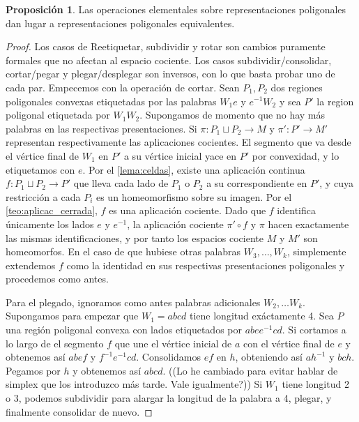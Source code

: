 \documentclass[10pt]{report}
\theoremstyle{definition}
\newtheorem{prop}[defin]{Proposición}
\begin{document}
\begin{prop}%
Las operaciones elementales sobre representaciones poligonales dan lugar a representaciones poligonales equivalentes.
\end{prop}
\begin{proof}
Los casos de Reetiquetar, subdividir y rotar son cambios puramente formales que no afectan al espacio cociente. Los casos subdividir/consolidar, cortar/pegar y plegar/desplegar son inversos, con lo que basta probar uno de cada par. 
Empecemos con la operación de cortar. Sean $P_1, P_2$ dos regiones poligonales convexas etiquetadas por las palabras $W_1e$ y $e^{-1}W_2$ y sea $P'$ la region poligonal etiquetada por $W_1 W_2$. Supongamos de momento que no hay más palabras en las respectivas presentaciones. Si $\pi :P_1\sqcup P_2\to M$ y $\pi' :P'\to M'$ representan respectivamente las aplicaciones cocientes. El segmento que va desde el vértice final de $W_1$ en $P'$ a su vértice inicial yace en $P'$ por convexidad, y lo etiquetamos con $e$. Por el \autoref{lema:celdas}, existe una aplicación continua $f:P_1\sqcup P_2\to P'$ que lleva cada lado de $P_1$ o $P_2$ a su correspondiente en $P'$, y cuya restricción a cada $P_i$ es un homeomorfismo sobre su imagen. Por el \autoref{teo:aplicac_cerrada}, $f$ es una aplicación cociente. Dado que $f$ identifica únicamente los lados $e$ y $e^{-1}$, la aplicación cociente $\pi '\circ f$ y $\pi$ hacen exactamente las mismas identificaciones, y por tanto los espacios cociente $M$ y $M'$ son homeomorfos. 
En el caso de que hubiese otras palabras $W_3,\dots ,W_k$, simplemente extendemos $f$ como la identidad en sus respectivas presentaciones poligonales y procedemos como antes.

Para el plegado, ignoramos como antes palabras adicionales $W_2,\dots W_k$. Supongamos para empezar que $W_1=abcd$ tiene longitud exáctamente 4. Sea $P$ una región poligonal convexa con lados etiquetados por $abee^{-1}cd$. Si cortamos a lo largo de el segmento $f$ que une el vértice inicial de $a$ con el vértice final de $e$ y obtenemos así $abef$ y $f^{-1}e^{-1}cd$. Consolidamos $ef$ en $h$, obteniendo así $ah^{-1}$ y $bch$. Pegamos por $h$ y obtenemos así $abcd$. ((Lo he cambiado para evitar hablar de simplex que los introduzco más tarde. Vale igualmente?))
Si $W_1$ tiene longitud 2 o 3, podemos subdividir para alargar la longitud de la palabra a 4, plegar, y finalmente consolidar de nuevo.
\end{proof}
\end{document}
